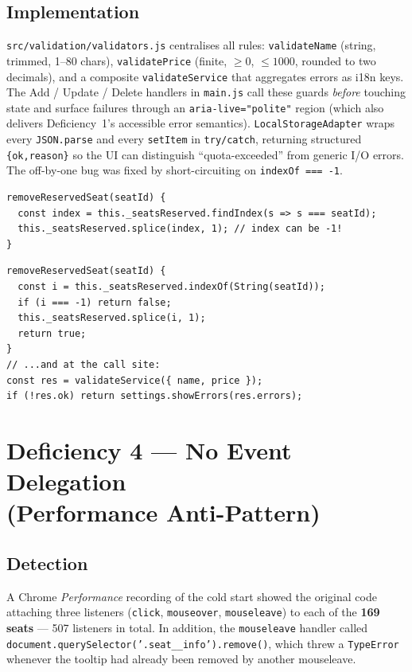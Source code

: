 \documentclass[a4paper,11pt]{article}
\begin{document}
\subsection{Implementation}
\texttt{src/validation/validators.js} centralises all rules:
\texttt{validateName} (string, trimmed, 1--80 chars),
\texttt{validatePrice} (finite, $\geq 0$, $\leq 1000$, rounded to two
decimals), and a composite \texttt{validateService} that aggregates
errors as i18n keys.  The Add / Update / Delete handlers in
\texttt{main.js} call these guards \emph{before} touching state and
surface failures through an \texttt{aria-live="polite"} region (which
also delivers Deficiency~1's accessible error semantics).
\texttt{LocalStorageAdapter} wraps every \texttt{JSON.parse} and every
\texttt{setItem} in \texttt{try/catch}, returning structured
\texttt{\{ok,reason\}} so the UI can distinguish ``quota-exceeded''
from generic I/O errors.  The off-by-one bug was fixed by short-circuiting
on \texttt{indexOf === -1}.

\begin{lstlisting}[caption={Original: silent off-by-one + zero validation.},captionpos=b]
removeReservedSeat(seatId) {
  const index = this._seatsReserved.findIndex(s => s === seatId);
  this._seatsReserved.splice(index, 1); // index can be -1!
}
\end{lstlisting}
\begin{lstlisting}[caption={Refactored: defensive guard + structured validation.},captionpos=b]
removeReservedSeat(seatId) {
  const i = this._seatsReserved.indexOf(String(seatId));
  if (i === -1) return false;
  this._seatsReserved.splice(i, 1);
  return true;
}
// ...and at the call site:
const res = validateService({ name, price });
if (!res.ok) return settings.showErrors(res.errors);
\end{lstlisting}

\section{Deficiency 4 --- No Event Delegation\\(Performance Anti-Pattern)}
\subsection{Detection}
A Chrome \textit{Performance} recording of the cold start showed the
original code attaching three listeners (\texttt{click},
\texttt{mouseover}, \texttt{mouseleave}) to each of the
\textbf{169 seats} --- 507 listeners in total.  In addition, the
\texttt{mouseleave} handler called
\texttt{document.querySelector('.seat\_\_info').remove()}, which
threw a \texttt{TypeError} whenever the tooltip had already been
removed by another mouseleave.
\end{document}
